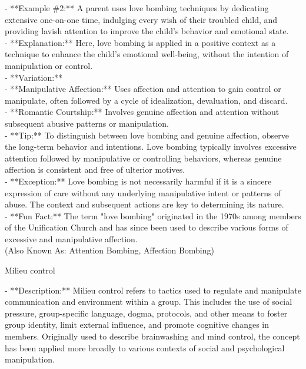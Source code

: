 \documentclass[a4paper,12pt,single,pdftex]{scrartcl}
\begin{document}
{    
      - **Example \#2:** A parent uses love bombing techniques by dedicating extensive one-on-one time, indulging every wish of their troubled child, and providing lavish attention to improve the child's behavior and emotional state.
    \\

    
      - **Explanation:** Here, love bombing is applied in a positive context as a technique to enhance the child's emotional well-being, without the intention of manipulation or control.
    \\

    
      - **Variation:**
    \\

    
        - **Manipulative Affection:** Uses affection and attention to gain control or manipulate, often followed by a cycle of idealization, devaluation, and discard.
    \\

    
        - **Romantic Courtship:** Involves genuine affection and attention without subsequent abusive patterns or manipulation.
    \\

    
      - **Tip:** To distinguish between love bombing and genuine affection, observe the long-term behavior and intentions. Love bombing typically involves excessive attention followed by manipulative or controlling behaviors, whereas genuine affection is consistent and free of ulterior motives.
    \\

    
      - **Exception:** Love bombing is not necessarily harmful if it is a sincere expression of care without any underlying manipulative intent or patterns of abuse. The context and subsequent actions are key to determining its nature.
    \\

    
      - **Fun Fact:** The term "love bombing" originated in the 1970s among members of the Unification Church and has since been used to describe various forms of excessive and manipulative affection.
    \\

  
    
      (Also Known As: Attention Bombing, Affection Bombing)
    \\

  }


Milieu control
    
      - **Description:** Milieu control refers to tactics used to regulate and manipulate communication and environment within a group. This includes the use of social pressure, group-specific language, dogma, protocols, and other means to foster group identity, limit external influence, and promote cognitive changes in members. Originally used to describe brainwashing and mind control, the concept has been applied more broadly to various contexts of social and psychological manipulation.
    \\
\end{document}
